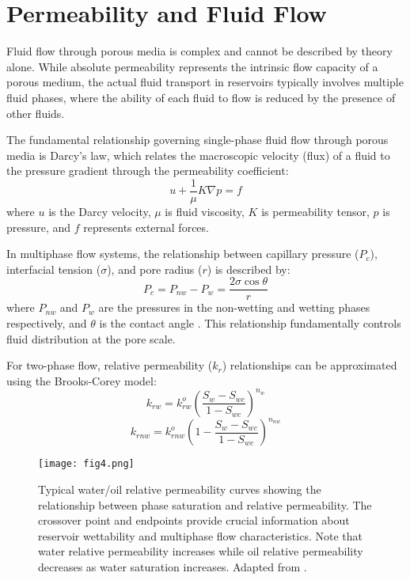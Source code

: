 \documentclass[journal]{IEEEtran}
\begin{document}
\section{Permeability and Fluid Flow}
Fluid flow through porous media is complex and cannot be described by theory alone. While absolute permeability represents the intrinsic flow capacity of a porous medium, the actual fluid transport in reservoirs typically involves multiple fluid phases, where the ability of each fluid to flow is reduced by the presence of other fluids.

The fundamental relationship governing single-phase fluid flow through porous media is Darcy's law, which relates the macroscopic velocity (flux) of a fluid to the pressure gradient through the permeability coefficient:
\begin{equation}
u + \frac{1}{\mu} K\nabla p = f
\end{equation}
where $u$ is the Darcy velocity, $\mu$ is fluid viscosity, $K$ is permeability tensor, $p$ is pressure, and $f$ represents external forces.

In multiphase flow systems, the relationship between capillary pressure ($P_c$), interfacial tension ($\sigma$), and pore radius ($r$) is described by:
\begin{equation}
P_c = P_{nw} - P_w = \frac{2\sigma\cos\theta}{r}
\end{equation}
where $P_{nw}$ and $P_w$ are the pressures in the non-wetting and wetting phases respectively, and $\theta$ is the contact angle \parencite{honarpour_relative-permeability_1988}. This relationship fundamentally controls fluid distribution at the pore scale.

For two-phase flow, relative permeability ($k_r$) relationships can be approximated using the Brooks-Corey model:
\begin{equation}
k_{rw} = k_{rw}^o(\frac{S_w - S_{wc}}{1 - S_{wc}})^{n_w}
\end{equation}
\begin{equation}
k_{rnw} = k_{rnw}^o(1 - \frac{S_w - S_{wc}}{1 - S_{wc}})^{n_{nw}}
\end{equation}

\begin{figure}[t]
    \centering
    \texttt{[image: fig4.png]}
    \caption{Typical water/oil relative permeability curves showing the relationship between phase saturation and relative permeability. The crossover point and endpoints provide crucial information about reservoir wettability and multiphase flow characteristics. Note that water relative permeability increases while oil relative permeability decreases as water saturation increases. Adapted from \textcite{honarpour_relative-permeability_1988}.}
    \label{fig:rel_perm}
\end{figure}
\end{document}
